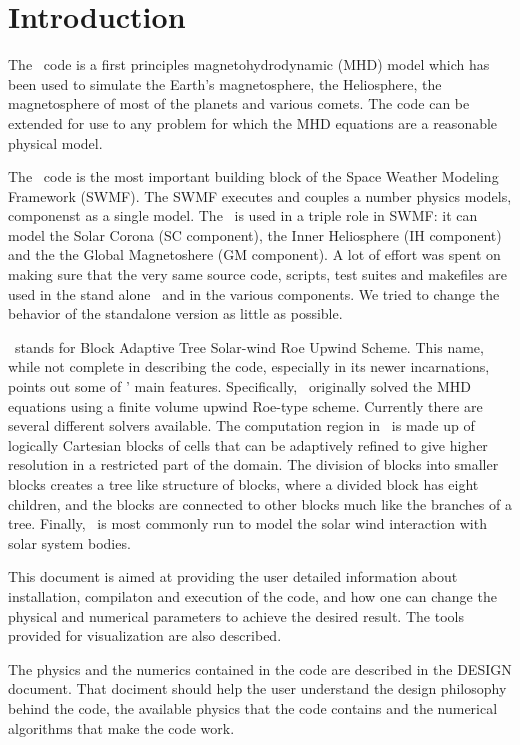 \chapter{Introduction \label{chapter:introduction}}

The \BATSRUS\ code is a first principles magnetohydrodynamic (MHD)
model which has been used to simulate the Earth's magnetosphere, the
Heliosphere, the magnetosphere of most of the planets and various comets.  
The code can be extended for use to any problem for which the MHD equations
are a reasonable physical model.

The \BATSRUS\ code is the most important building block of the
Space Weather Modeling Framework (SWMF). The SWMF executes and
couples a number physics models, componenst as a single model.
The \BATSRUS\ is used in a triple role in SWMF: 
it can model the Solar Corona (SC component), 
the Inner Heliosphere (IH component) and the 
the Global Magnetoshere (GM component).
A lot of effort was spent on making sure that the very same 
source code, scripts, test suites and makefiles are used in
the stand alone \BATSRUS\ and in the various components.
We tried to change the behavior of the standalone version
as little as possible. 

\BATSRUS\ stands for Block Adaptive Tree Solar-wind Roe Upwind Scheme.
This name, while not complete in describing the code, especially in its
newer incarnations, points out some of \BATSRUS' main features.  Specifically,
\BATSRUS\ originally solved the MHD equations using a finite volume upwind 
Roe-type scheme.
Currently there are several different solvers available.  The computation
region in \BATSRUS\ is made up of logically Cartesian blocks of cells that can be 
adaptively refined to give higher resolution in a restricted part of the 
domain.  The division of blocks into smaller blocks creates a tree like
structure of blocks, where a divided block has eight children, and the blocks
are connected to other blocks much like the branches of a tree.
Finally, \BATSRUS\ is most commonly run  to model the solar wind
interaction with solar system bodies.  

This document is aimed at providing the user detailed information about
installation, compilaton and execution of the code, and 
how one can change the physical and numerical parameters
to achieve the desired result. The tools provided for visualization
are also described.

The physics and the numerics contained in the code are described in
the DESIGN document. That dociment should help
the user understand the design philosophy behind the code, the 
available physics that the code contains and the numerical algorithms that
make the code work. 

